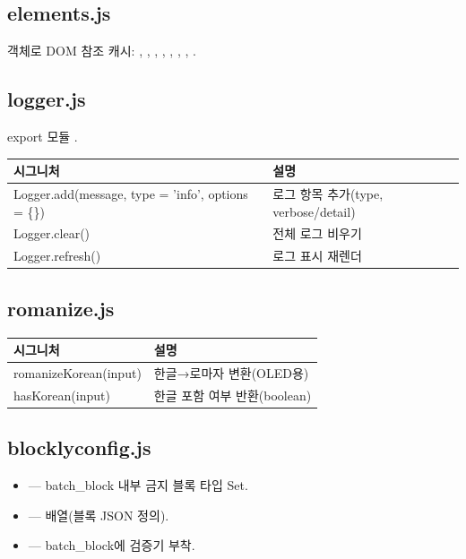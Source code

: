 \subsection{elements.js}

 객체로 DOM 참조 캐시: , ,
, , , ,
, .

\subsection{logger.js}

\noindent export 모듈 .

\begin{longtable}{S{8.2cm} L{5.8cm}}
\toprule
{}\normalfont\sffamily\bfseries 시그니처 & \normalfont\sffamily\bfseries 설명 \\
\midrule
\endhead
Logger.add(message, type = 'info', options = \{\}) & 로그 항목 추가(type, verbose/detail) \\
Logger.clear() & 전체 로그 비우기 \\
Logger.refresh() & 로그 표시 재렌더 \\
\bottomrule
\end{longtable}

\subsection{romanize.js}

\begin{longtable}{S{7.4cm} L{6.6cm}}
\toprule
{}\normalfont\sffamily\bfseries 시그니처 & \normalfont\sffamily\bfseries 설명 \\
\midrule
\endhead
romanizeKorean(input) & 한글→로마자 변환(OLED용) \\
hasKorean(input) & 한글 포함 여부 반환(boolean) \\
\bottomrule
\end{longtable}

\subsection{blocklyconfig.js}

\begin{itemize}
  \item {} --- batch\_block 내부 금지 블록 타입 Set.
  \item {} ---  배열(블록 JSON 정의).
  \item {} --- batch\_block에
         검증기 부착.
\end{itemize}

